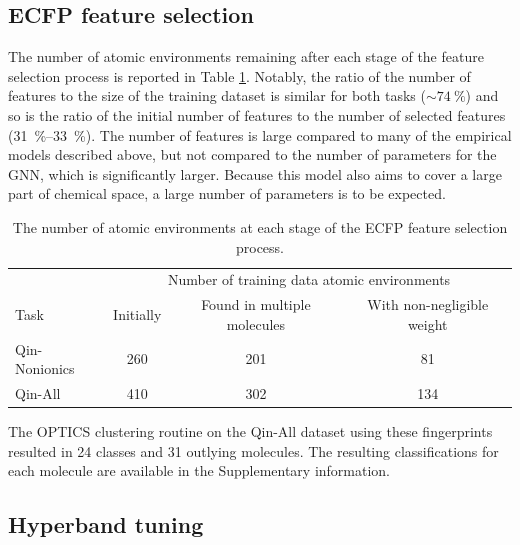 \subsection{ECFP feature selection}

The number of atomic environments remaining after each stage of the feature
selection process is reported in Table \ref{tab:ecfp-fs}. Notably, the ratio of
the number of features to the size of the training dataset is similar for both
tasks ($\sim \SI{74}{\%}$) and so is the ratio of the initial number of features
to the number of selected features (\SIrange{31}{33}{\%}). The number of
features is large compared to many of the empirical models described above, but
not compared to the number of parameters for the GNN, which is significantly
larger. Because this model also aims to cover a large part of chemical space, a
large number of parameters is to be expected.

\begin{table}
    \centering
    \caption{The number of atomic environments at each stage of the ECFP feature selection process.}
    \label{tab:ecfp-fs}
    \begin{tabular}{@{}lccc@{}} \toprule
                      & \multicolumn{3}{c}{Number of training data atomic environments}                                                            \\\cmidrule(l){2-4}
        Task          & Initially                                                       & Found in multiple molecules & With non-negligible weight \\\midrule
        Qin-Nonionics & 260                                                             & 201                         & 81                         \\
        Qin-All       & 410                                                             & 302                         & 134                        \\\bottomrule
    \end{tabular}
\end{table}

The OPTICS clustering routine on the Qin-All dataset using these fingerprints
resulted in 24 classes and 31 outlying molecules. The resulting classifications
for each molecule are available in the Supplementary information.

\subsection{Hyperband tuning}

